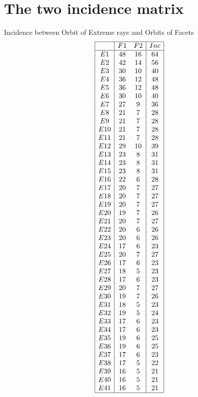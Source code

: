 \documentclass[12pt]{article}
\begin{document}
\section{The two incidence matrix}
Incidence between Orbit of Extreme rays and Orbits of Facets
\begin{equation*}
\begin{array}{|c|cc|c|}
\hline
&F1&F2&Inc\\
\hline
E1&48&16&64\\
E2&42&14&56\\
E3&30&10&40\\
E4&36&12&48\\
E5&36&12&48\\
E6&30&10&40\\
E7&27&9&36\\
E8&21&7&28\\
E9&21&7&28\\
E10&21&7&28\\
E11&21&7&28\\
E12&29&10&39\\
E13&23&8&31\\
E14&23&8&31\\
E15&23&8&31\\
E16&22&6&28\\
E17&20&7&27\\
E18&20&7&27\\
E19&20&7&27\\
E20&19&7&26\\
E21&20&7&27\\
E22&20&6&26\\
E23&20&6&26\\
E24&17&6&23\\
E25&20&7&27\\
E26&17&6&23\\
E27&18&5&23\\
E28&17&6&23\\
E29&20&7&27\\
E30&19&7&26\\
E31&18&5&23\\
E32&19&5&24\\
E33&17&6&23\\
E34&17&6&23\\
E35&19&6&25\\
E36&19&6&25\\
E37&17&6&23\\
E38&17&5&22\\
E39&16&5&21\\
E40&16&5&21\\
E41&16&5&21\\
\hline
\end{array}
\end{equation*}
\end{document}
